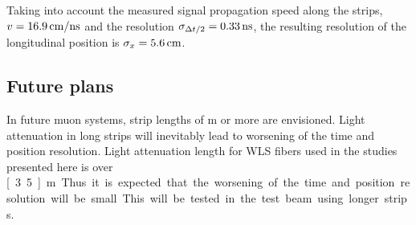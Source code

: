 Taking into account the measured signal propagation speed along the strips, \mbox{$v=\unit[16.9]{cm/ns}$} and the resolution $\sigma_{\Delta t/2} = \unit[0.33]{ns}$, the resulting resolution of the longitudinal position is $\sigma_x = \unit[5.6]{cm}$.

\subsection{Future plans}

In future muon systems, strip lengths of \unit[2]{m} or more are envisioned. Light attenuation in long strips will inevitably lead to worsening of the time and position resolution. Light attenuation length for WLS fibers used in the studies presented here is over \unit[3.5]{m}. Thus it is expected that the worsening of the time and position resolution will be small. This will be tested in the test beam using longer strips.
